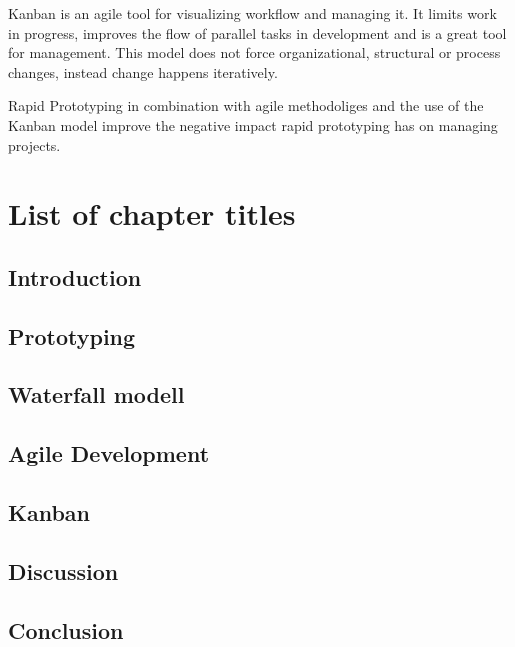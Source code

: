 \documentclass[runningheads]{llncs}
\begin{document}
Kanban is an agile tool for visualizing workflow and managing it. It limits work in progress, improves the flow of parallel tasks in development
and is a great tool for management. This model does not force organizational, structural or process changes, instead change happens iteratively.

Rapid Prototyping in combination with agile methodoliges and the use of the Kanban model improve the negative impact rapid prototyping has on managing projects.


\section{List of chapter titles}

\subsection{Introduction}
\subsection{Prototyping}
\subsection{Waterfall modell}
\subsection{Agile Development}
\subsection{Kanban}
\subsection{Discussion}
\subsection{Conclusion}
\end{document}
